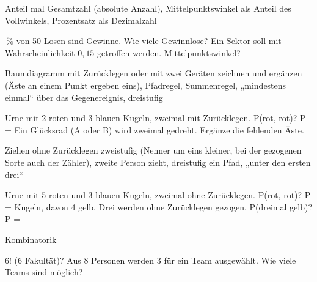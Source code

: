 \begin{aufgabe}{Anteil mal Gesamtzahl (absolute Anzahl), Mittelpunktswinkel als Anteil des Vollwinkels, Prozentsatz als Dezimalzahl}
\begin{teile}
\,\% von 50 Losen sind Gewinne. Wie viele Gewinnlose? \leerfeld
\teil Ein Sektor soll mit Wahrscheinlichkeit $0{,}15$ getroffen werden. Mittelpunktswinkel? \leerfeld[°]
\end{teile}
\end{aufgabe}

\begin{aufgabe}{Baumdiagramm mit Zurücklegen oder mit zwei Geräten zeichnen und ergänzen (Äste an einem Punkt ergeben eins), Pfadregel, Summenregel, „mindestens einmal“ über das Gegenereignis, dreistufig}
\begin{teile}
\teil Urne mit 2 roten und 3 blauen Kugeln, zweimal mit Zurücklegen. P(rot, rot)? P = \leerfeld
\teil Ein Glücksrad (A oder B) wird zweimal gedreht. Ergänze die fehlenden Äste.

\end{teile}
\end{aufgabe}

\begin{aufgabe}{Ziehen ohne Zurücklegen zweistufig (Nenner um eins kleiner, bei der gezogenen Sorte auch der Zähler), zweite Person zieht, dreistufig ein Pfad, „unter den ersten drei“}
\begin{teile}
\teil Urne mit 5 roten und 3 blauen Kugeln, zweimal ohne Zurücklegen. P(rot, rot)? P = \leerfeld
{} Kugeln, davon 4 gelb. Drei werden ohne Zurücklegen gezogen. P(dreimal gelb)? P = \leerfeld
\end{teile}
\end{aufgabe}

\begin{aufgabe}{Kombinatorik}
\begin{teile}
\teil $6!$ (6 Fakultät)? \leerfeld
\teil Aus 8 Personen werden 3 für ein Team ausgewählt. Wie viele Teams sind möglich? \leerfeld
\end{teile}
\end{aufgabe}

